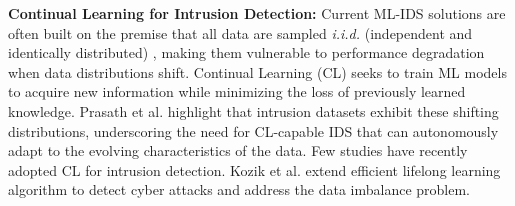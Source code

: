 \textbf{Continual Learning for Intrusion Detection:} Current ML-IDS solutions are often built on the premise that all data are sampled \textit{i.i.d.} (independent and identically distributed) \cite{verwimp2023continual}, making them vulnerable to performance degradation when data distributions shift. %
Continual Learning (CL) seeks to train ML models to acquire new information while minimizing the loss of previously learned knowledge. %
Prasath et al. \cite{prasath2022analysis} highlight that intrusion datasets exhibit these shifting distributions, underscoring the need for CL-capable IDS that can autonomously adapt to the evolving characteristics of the data.
Few studies have recently adopted CL for intrusion detection. Kozik et al. \cite{kozik2019balanced} extend efficient lifelong learning algorithm \cite{ruvolo2013ella} to detect cyber attacks and address the data imbalance problem. %

